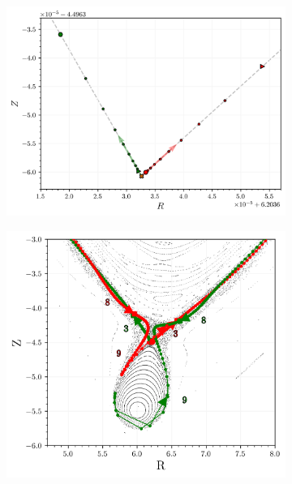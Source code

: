 \begin{figure}[H]
    \centering
    \begin{minipage}{0.45\textwidth} %
        \centering
        \begin{subfigure}[b]{\textwidth}
            \centering
            \includegraphics[width=\textwidth]{images/manifold/manifold_start.png}
            \caption{}
            \label{fig:man-a}
        \end{subfigure}
        \vfill
        \vspace{10px}
        \vfill
        \begin{subfigure}[b]{0.99\textwidth}
            \centering
            \includegraphics[width=\textwidth]{images/manifold/manifold_closer.png}

\end{subfigure}
\end{minipage}
\end{figure}
